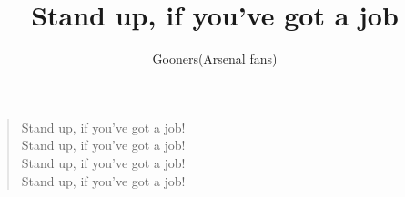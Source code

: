 \documentclass[a4paper,12pt]{article}
\title{Stand up, if you've got a job}
\author{Gooners(Arsenal fans)}
\date{}
\begin{document}
	
	\maketitle
	
	\begin{verse}
		
		Stand up, if you've got a job! \\
		Stand up, if you've got a job! \\
		Stand up, if you've got a job! \\
		Stand up, if you've got a job!
		
	\end{verse}
	
\end{document}
